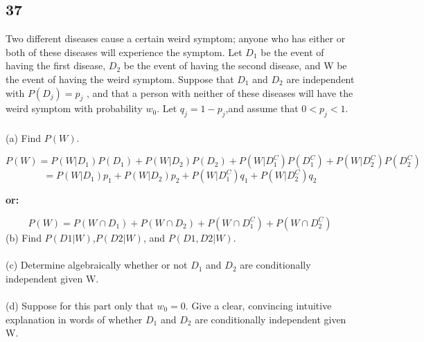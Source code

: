 \documentclass{article}
\begin{document}
\subsection{37}
Two different diseases cause a certain weird symptom; anyone who has either or both of these diseases will experience the symptom. Let $D_1$ be the event of having the first disease, $D_2$ be the event of having the second disease, and W be the event of having the weird symptom. Suppose that $D_1$ and $D_2$ are independent with $P(D_j )= p_j$ , and that a person with neither of these diseases will have the weird symptom with probability $w_0$. Let $q_j =1-p_j$,and assume that $0<p_j <1$. \\\\
(a) Find $P(W)$. 

$$P(W)=P(W|D_1)P(D_1)+P(W|D_2)P(D_2)+P(W|D_1^C)P(D_1^C)+P(W|D_2^C)P(D_2^C)$$
$$=P(W|D_1)p_1+P(W|D_2)p_2+P(W|D_1^C)q_1+P(W|D_2^C)q_2$$

\textbf{or:}

$$P(W)=P(W \cap D_1)+P(W \cap D_2)+P(W \cap D_1^C)+P(W \cap D_2^C)$$
(b) Find $P(D1|W)$,$P(D2|W)$, and $P(D1,D2|W)$.\\\\
(c) Determine algebraically whether or not $D_1$ and $D_2$ are conditionally independent given W.\\\\
(d) Suppose for this part only that $w_0 = 0$. Give a clear, convincing intuitive explanation in words of whether $D_1$ and $D_2$ are conditionally independent given W.
\end{document}
